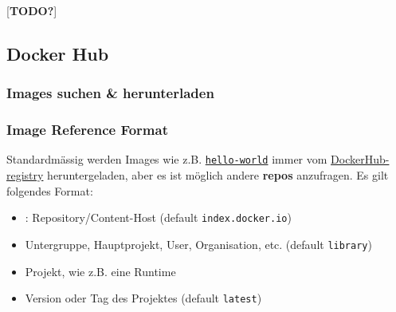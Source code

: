 \documentclass[
  10pt,
  a4paper,
  twocolumn]{article}
\newenvironment{Shaded}{}{}
\newcommand{\ExtensionTok}[1]{\textcolor[rgb]{0.84,0.23,0.29}{\textbf{#1}}}
\newcommand{\NormalTok}[1]{\textcolor[rgb]{0.14,0.16,0.18}{#1}}
\newcommand{\OperatorTok}[1]{\textcolor[rgb]{0.14,0.16,0.18}{#1}}
\providecommand{\tightlist}{%
  \setlength{\itemsep}{0pt}\setlength{\parskip}{0pt}}\usepackage{longtable,booktabs,array}
\begin{document}
\textcolor{BrickRed}{[\textbf{TODO?}]}

\subsection{Docker Hub}\label{docker-hub}

\subsubsection{Images suchen \&
herunterladen}\label{images-suchen-herunterladen}

\begin{Shaded}
\end{Shaded}

\begin{Shaded}
\end{Shaded}

\subsubsection{Image Reference Format}\label{image-reference-format}

Standardmässig werden Images wie z.B.
\href{https://registry.hub.docker.com/_/hello-world}{\texttt{hello-world}}
immer vom \href{https://registry.hub.docker.com/}{DockerHub-registry}
heruntergeladen, aber es ist möglich andere \textbf{repos} anzufragen.
Es gilt folgendes Format:

\begin{center}
\texttt{\textbf{\color{BrickRed}{<repo>}}{\color{Gray}{/}}\textbf{\color{OliveGreen}{<source>}}{\color{Gray}{/}}\textbf{\color{NavyBlue}{<image>}}{\color{Gray}{/}}\textbf{\color{Periwinkle}{<tag>}}}

\end{center}

\begin{itemize}
\tightlist
\item
  \textbf{\texttt{\color{BrickRed}{<repo>}}}: Repository/Content-Host
  (default \texttt{index.docker.io})
\item
  \textbf{\texttt{\color{OliveGreen}{<source>}}} Untergruppe,
  Hauptprojekt, User, Organisation, etc. (default \texttt{library})
\item
  \textbf{\texttt{\color{NavyBlue}{<image>}}} Projekt, wie z.B. eine
  Runtime
\item
  \textbf{\texttt{\color{Periwinkle}{<tag>}}} Version oder Tag des
  Projektes (default \texttt{latest})
\end{itemize}
\end{document}
